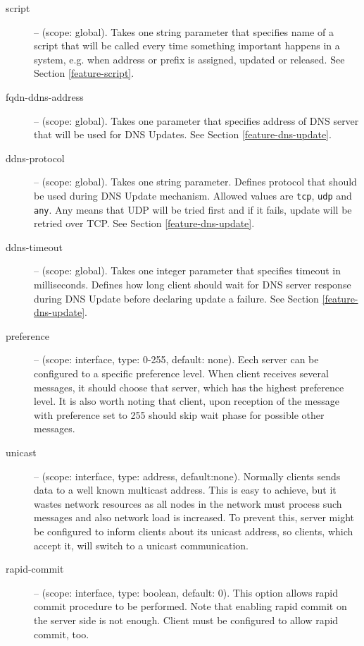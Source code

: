 \begin{description}
\item[script] -- (scope: global). Takes one string parameter that
  specifies name of a script that will be called every time something
  important happens in a system, e.g. when address or prefix is
  assigned, updated or released. See Section \ref{feature-script}.

\item[fqdn-ddns-address] -- (scope: global). Takes one parameter that
  specifies address of DNS server that will be used for DNS
  Updates. See Section \ref{feature-dns-update}.

\item[ddns-protocol] -- (scope: global). Takes one string
parameter. Defines protocol that should be used during DNS Update
mechanism. Allowed values are \verb+tcp+, \verb+udp+ and \verb+any+.
Any means that UDP will be tried first and if it fails, update will be
retried over TCP. See Section \ref{feature-dns-update}.

\item[ddns-timeout] -- (scope: global). Takes one integer parameter
that specifies timeout in milliseconds. Defines how long client should
wait for DNS server response during DNS Update before declaring
update a failure. See Section \ref{feature-dns-update}.

 \item[preference] -- (scope: interface, type: 0-255, default:
            none). Eech server can be configured to a specific
            preference level. When client receives several
             messages, it should choose that server,
            which has the highest preference level. It is also worth
            noting that client, upon reception of the 
            message with preference set to 255 should skip wait phase
            for possible other  messages.


 \item[unicast] -- (scope: interface, type: address,
            default:none). Normally clients sends data to a well known
            multicast address. This is easy to achieve, but it wastes
            network resources as all nodes in the network must process
            such messages and also network load is increased. To prevent
            this, server might be configured to inform clients about its
            unicast address, so clients, which accept it, will switch to
            a unicast communication.

 \item[rapid-commit] -- (scope: interface, type: boolean, default:
            0). This option allows rapid commit procedure to be
            performed. Note that enabling rapid commit on the server
            side is not enough. Client must be configured to allow
            rapid commit, too.


\end{description}
